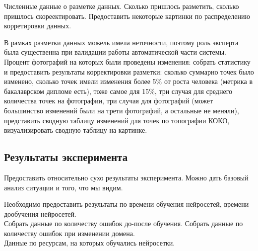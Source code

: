 Численные данные о разметке данных. Сколько пришлось разметить, сколько пришлось скореектировать. Предоставить некоторые картинки по распределению корретировки данных.

В рамках разметки данных можель имела неточности, поэтому роль эксперта была существенна при валидации работы автоматической части системы. Процент фотографий на которых были проведены изменения: собрать статистику и предоставить результаты корректировки разметки: сколько суммарно точек было изменено, сколько точек имели изменения более 5\% от роста человека (метрика в бакалаврском дипломе есть), тоже самое для 15\%, три случая для среднего количества точек на фотографии, три случая для фотографий (может большинство изменений были на трети фотографий, а остальные не меняли), представить сводную таблицу изменений для точек по топографии КОКО, визуализировать сводную таблицу на картинке. 

\subsection{Результаты эксперимента}

Предоставить относительно сухо результаты эксперимента. Можно дать базовый анализ ситуации и того, что мы видим.

Необходимо предоставить результаты по времени обучения нейросетей, времени дообучения нейросетей. \\ 
Собрать данные по количеству ошибок до-после обучения. Собрать данные по количеству ошибок при изменении домена. \\ 
Данные по ресурсам, на которых обучались нейросетки.


\newpage